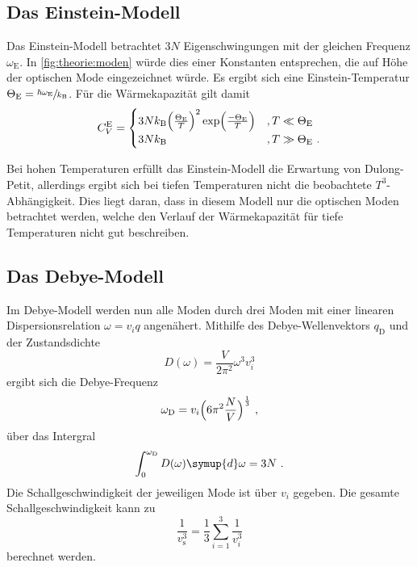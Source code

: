 \subsection{Das Einstein-Modell}
\label{sec:theorie:einstein}

    Das Einstein-Modell betrachtet $3N$ Eigenschwingungen mit der gleichen Frequenz $\omega_\text{E}$.
    In \autoref{fig:theorie:moden} würde dies einer Konstanten entsprechen,
    die auf Höhe der optischen Mode eingezeichnet würde.
    Es ergibt sich eine Einstein-Temperatur $\Theta_\text{E} = \sfrac{\hbar \omega_\text{E}}{k_\text{B}}$.
    Für die Wärmekapazität gilt damit
    \begin{equation*}
        C^{\text{E}}_V =
        \begin{cases}
            3Nk_\text{B} \Bigl(\frac{\Theta_\text{E}}{T}\Bigr)^2 \exp\Bigl(\frac{-\Theta_\text{E}}{T}\Bigr) & , T \ll \Theta_\text{E} \\
            3Nk_\text{B} & , T \gg \Theta_\text{E} \ .
        \end{cases}
    \end{equation*}

    Bei hohen Temperaturen erfüllt das Einstein-Modell die Erwartung von Dulong-Petit,
    allerdings ergibt sich bei tiefen Temperaturen nicht die beobachtete $T^3$-Abhängigkeit.
    Dies liegt daran,
    dass in diesem Modell nur die optischen Moden betrachtet werden,
    welche den Verlauf der Wärmekapazität für tiefe Temperaturen nicht gut beschreiben.

\subsection{Das Debye-Modell}
\label{sec:theorie:debye}

    Im Debye-Modell werden nun alle Moden durch drei Moden mit einer linearen Dispersionsrelation $\omega = v_i q$ angenähert.
    Mithilfe des Debye-Wellenvektors $q_\text{D}$ und der Zustandsdichte
    \begin{equation*}
        D(\omega) = \frac{V}{2 \pi^2}{\omega^3}{v^3_i}
    \end{equation*}
    ergibt sich die Debye-Frequenz
    \begin{equation*}
        \omega_\text{D} = v_i \Bigl(6 \pi^2 \frac{N}{V}\Bigr)^{\frac{1}{3}} \ ,
    \end{equation*}
    über das Intergral
    \begin{equation}
        \int_0^{\omega_\text{D}} D(\omega) \symup{d}\omega = 3N \ .
        \label{eqn:theorie:debye_int}
    \end{equation}
    Die Schallgeschwindigkeit der jeweiligen Mode ist über $v_i$ gegeben.
    Die gesamte Schallgeschwindigkeit kann zu
    \begin{equation}
        \frac{1}{v^3_\text{s}} = \frac{1}{3} \sum_{i=1}^3 \frac{1}{v^3_i}
        \label{eqn:theorie:schallgeschwindigkeit}
    \end{equation}
    berechnet werden.

